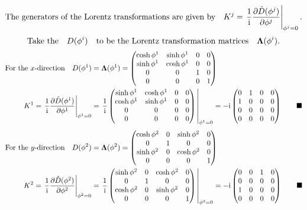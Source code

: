 \documentclass{article}
\begin{document}
\[\qq*{The generators of the Lorentz transformations are given by}K^j=\eval{\frac{1}{\text{i}}\pdv{\hat{D}(\phi^j)}{\phi^j}}_{\phi^j=0}.\]
\[ \qq*{Take the} D(\phi^i) \qq{to be the Lorentz transformation matrices}\vb{\Lambda}(\phi^i).\]
\begin{align*}
	\qq*{For the $x$-direction}D(\phi^1)                                  & =\vb{\Lambda}(\phi^1)=\begin{pmatrix}
		\cosh{\phi^1} & \sinh{\phi^1} & 0 & 0 \\
		\sinh{\phi^1} & \cosh{\phi^1} & 0 & 0 \\ 
		0             & 0             & 1 & 0 \\
		0             & 0             & 0 & 1
	\end{pmatrix}                                                                     \\
	K^1=\eval{\frac{1}{\text{i}}\pdv{\hat{D}(\phi^1)}{\phi^1}}_{\phi^1=0} & =\eval{\frac{1}{\text{i}}\begin{pmatrix}
			\sinh{\phi^1} & \cosh{\phi^1} & 0 & 0 \\
			\cosh{\phi^1} & \sinh{\phi^1} & 0 & 0 \\ 
			0             & 0             & 0 & 0 \\
			0             & 0             & 0 & 0
		\end{pmatrix}}_{\phi^1=0}=-\text{i}\begin{pmatrix}
		0 & 1 & 0 & 0 \\
		1 & 0 & 0 & 0 \\ 
		0 & 0 & 0 & 0 \\
		0 & 0 & 0 & 0
	\end{pmatrix}\qquad\blacksquare
\end{align*}\begin{align*}
	\qq*{For the $y$-direction}D(\phi^2)                                  & =\vb{\Lambda}(\phi^2)=\begin{pmatrix}
		\cosh{\phi^2} & 0 & \sinh{\phi^2} & 0 \\
		0             & 1 & 0             & 0 \\ 
		\sinh{\phi^2} & 0 & \cosh{\phi^2} & 0 \\
		0             & 0 & 0             & 1
	\end{pmatrix}                                                                     \\
	K^2=\eval{\frac{1}{\text{i}}\pdv{\hat{D}(\phi^2)}{\phi^2}}_{\phi^2=0} & =\eval{\frac{1}{\text{i}}\begin{pmatrix}
			\sinh{\phi^2} & 0 & \cosh{\phi^2} & 0 \\
			0             & 1 & 0             & 0 \\ 
			\cosh{\phi^2} & 0 & \sinh{\phi^2} & 0 \\
			0             & 0 & 0             & 1
		\end{pmatrix}}_{\phi^2=0}=-\text{i}\begin{pmatrix}
		0 & 0 & 1 & 0 \\
		0 & 0 & 0 & 0 \\
		1 & 0 & 0 & 0 \\ 
		0 & 0 & 0 & 0
	\end{pmatrix}\qquad\blacksquare
\end{align*}
\end{document}
